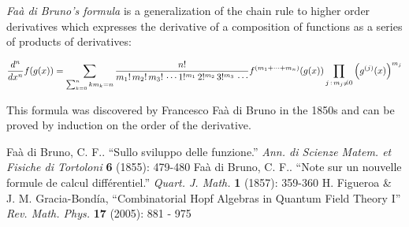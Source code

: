 \documentclass[12pt]{article}
\begin{document}
{\em Fa\`a di Bruno's formula} is a generalization of the chain rule
to higher order derivatives which expresses the derivative of a 
composition of functions as a series of products of derivatives:

$${d^n \over dx^n} f(g(x))=\sum_{\sum_{k=0}^n k m_k = n} \frac{n!}{m_1!\,m_2!\,m_3!\,\cdots 1!^{m_1}\,2!^{m_2}\,3!^{m_3}\,\cdots} f^{(m_1 + \cdots + m_n)}(g(x)) \prod_{j\,:\,m_j\neq 0}\left(g^{(j)}(x)\right)^{m_j}$$

This formula was discovered by Francesco Fa\`a di Bruno in the 1850s and can
be proved by induction on the order of the derivative.

\begin{thebibliography}{1}
\bibitem{} Fa\`a di Bruno, C. F.. ``Sullo sviluppo delle funzione.'' {\it Ann. di 
Scienze Matem. et Fisiche di Tortoloni} {\bf 6} (1855): 479-480
\bibitem{} Fa\`a di Bruno, C. F.. ``Note sur un nouvelle formule de calcul diff\'erentiel.'' {\it Quart. J. Math.} {\bf 1} (1857): 359-360
\bibitem{} H. Figueroa \& J. M. Gracia-Bond\'ia, ``Combinatorial Hopf Algebras in Quantum Field Theory I'' {\it Rev. Math. Phys.} {\bf 17} (2005): 881 - 975
\end{thebibliography}

\end{document}
